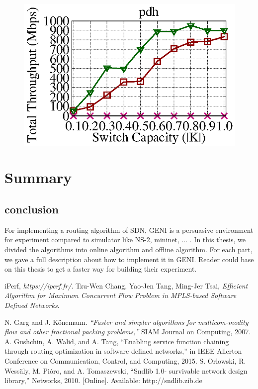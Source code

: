 \documentclass[a4paper,12pt]{report}
\begin{document}
\begin{large}
\begin{figure}[ht]
	  \includegraphics[width=1.0\textwidth]{pdh_geni_throughput_e05.eps}
  \end{figure}
  \chapter{Summary}
    \section{conclusion}
    \qquad For implementing a routing algorithm of SDN, GENI is a persuasive environment for experiment compared to simulator like NS-2, mininet, ... . In this thesis, we divided the algorithms into online algorithm and offline algorithm. For each part, we gave a full description about how to implement it in GENI.  Reader could base on this thesis to get a faster way for building their experiment. 
  \begin{thebibliography}{1}
    iPerf, \emph{https://iperf.fr/}.
    Tzu-Wen Chang, Yao-Jen Tang, Ming-Jer Tsai, \emph{Efficient Algorithm for Maximum Concurrent Flow Problem in MPLS-based Software Defined Networks}.
 
    N. Garg and J. Könemann. \emph{“Faster and simpler algorithms for multicom-modity flow and other fractional packing problems,”} SIAM Journal on
Computing, 2007.
	A. Gushchin, A. Walid, and A. Tang, “Enabling service function chaining
through routing optimization in software defined networks,” in IEEE
Allerton Conference on Communication, Control, and Computing, 2015.
	S. Orlowski, R. Wessäly, M. Pióro, and A. Tomaszewski, “Sndlib 1.0-
survivable network design library,” Networks, 2010. [Online]. Available:
http://sndlib.zib.de
\end{thebibliography}
  \end{large}
  
\end{document}
